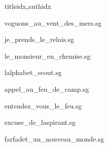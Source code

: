 \documentclass[
    ]{article}
\begin{document}
\begin{songs}{titleidx,authidx}

{voguons_au_vent_des_mers.sg}


{je_prends_le_relais.sg}


{le_monsieur_en_chemise.sg}


{lalphabet_scout.sg}


{appel_au_feu_de_camp.sg}


{entendez_vous_le_feu.sg}


{excuse_de_laspirant.sg}


{farfadet_un_nouveau_monde.sg}



\end{songs}
\end{document}

